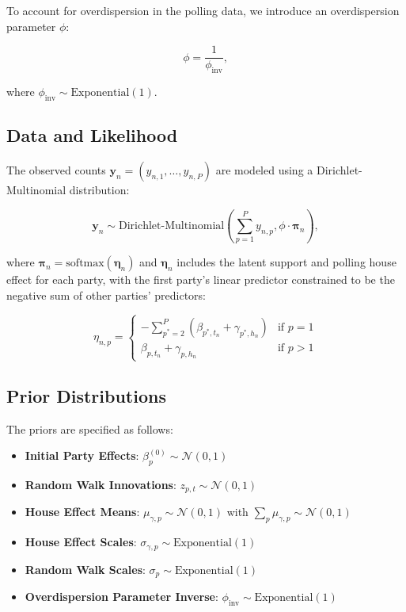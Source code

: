 \documentclass[
  letterpaper,
  DIV=11,
  numbers=noendperiod]{scrartcl}
\providecommand{\tightlist}{%
  \setlength{\itemsep}{0pt}\setlength{\parskip}{0pt}}\usepackage{longtable,booktabs,array}
\begin{document}
To account for overdispersion in the polling data, we introduce an
overdispersion parameter \(\phi\):

\[
\phi = \frac{1}{\phi_{\text{inv}}},
\]

where \(\phi_{\text{inv}} \sim \text{Exponential}(1)\).

\subsection{Data and Likelihood}\label{data-and-likelihood}

The observed counts
\(\mathbf{y}_{n} = \left(y_{n,1}, \dots, y_{n,P}\right)\) are modeled
using a Dirichlet-Multinomial distribution:

\[
\mathbf{y}_{n} \sim \text{Dirichlet-Multinomial}\left(\sum_{p=1}^P y_{n,p}, \phi \cdot \boldsymbol{\pi}_{n}\right),
\]

where
\(\boldsymbol{\pi}_{n} = \text{softmax}\left(\boldsymbol{\eta}_{n}\right)\)
and \(\boldsymbol{\eta}_{n}\) includes the latent support and polling
house effect for each party, with the first party's linear predictor
constrained to be the negative sum of other parties' predictors:

\[
\eta_{n,p} = \begin{cases}
-\sum_{p^*=2}^{P} (\beta_{p^*,t_n} + \gamma_{p^*,h_n}) & \text{if } p = 1 \\
\beta_{p,t_n} + \gamma_{p,h_n} & \text{if } p > 1
\end{cases}
\]

\subsection{Prior Distributions}\label{prior-distributions}

The priors are specified as follows:

\begin{itemize}
\tightlist
\item
  \textbf{Initial Party Effects}:
  \(\beta_{p}^{(0)} \sim \mathcal{N}(0, 1)\)
\item
  \textbf{Random Walk Innovations}: \(z_{p,t} \sim \mathcal{N}(0, 1)\)
\item
  \textbf{House Effect Means}: \(\mu_{\gamma,p} \sim \mathcal{N}(0, 1)\)
  with \(\sum_p \mu_{\gamma,p} \sim \mathcal{N}(0, 1)\)
\item
  \textbf{House Effect Scales}:
  \(\sigma_{\gamma,p} \sim \text{Exponential}(1)\)
\item
  \textbf{Random Walk Scales}: \(\sigma_p \sim \text{Exponential}(1)\)
\item
  \textbf{Overdispersion Parameter Inverse}:
  \(\phi_{\text{inv}} \sim \text{Exponential}(1)\)
\end{itemize}
\end{document}
